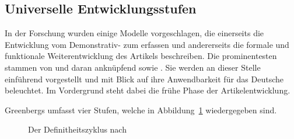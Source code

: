 \subsection{Universelle Entwicklungsstufen}\label{sec:stufen}

In der Forschung wurden einige Modelle vorgeschlagen, die einerseits die Entwicklung vom Demonstrativ-  zum  erfassen und andererseits die formale und funktionale Weiterentwicklung des Artikels beschreiben. Die prominentesten stammen von \textcite{Greenberg1978} und daran anknüpfend \textcite{Lehmann2015} sowie \textcite{Schmuck2014}. Sie werden an dieser Stelle einführend vorgestellt und mit Blick auf ihre Anwendbarkeit für das Deutsche beleuchtet. Im Vordergrund steht dabei die frühe Phase der Artikelentwicklung. 
%

Greenbergs  \parencite[61]{Greenberg1978} umfasst vier Stufen, welche in Abbildung~\ref{abb:greenberg} \parencite[entnommen aus][525]{deMulder2011} wiedergegeben sind.

\begin{figure}
\caption {Der Definitheitszyklus nach \textcite{Greenberg1978}\label{abb:greenberg}}
\end{figure}

